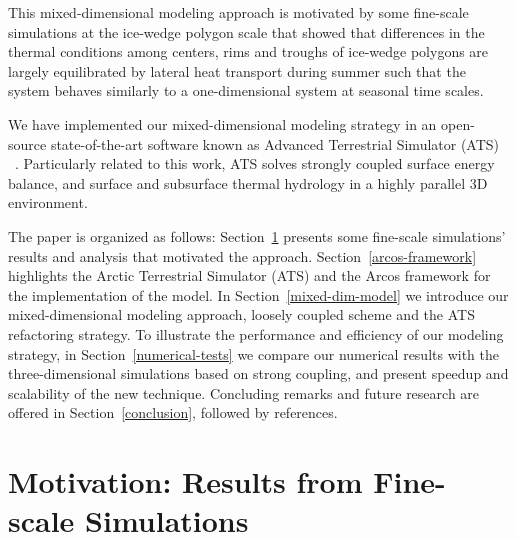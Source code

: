 \documentclass[review]{elsarticle}
\begin{document}
This mixed-dimensional modeling approach is motivated by some fine-scale simulations at the ice-wedge polygon scale that showed that differences in the thermal conditions among centers, rims and troughs of ice-wedge polygons are largely equilibrated by lateral heat transport during summer such that the system behaves similarly to a one-dimensional system at seasonal time scales. 

We have implemented our mixed-dimensional modeling strategy in an open-source state-of-the-art software known as Advanced Terrestrial Simulator (ATS) 
~\cite{ecoon2016managing, spainter2016integrated}. Particularly related to this work, ATS solves strongly coupled surface energy balance, and surface and subsurface thermal hydrology in a highly parallel 3D environment. 

The paper is organized as follows: Section~\ref{motivation} presents some fine-scale simulations' results and analysis that motivated the approach. Section~\ref{arcos-framework} highlights the Arctic Terrestrial Simulator (ATS) and the Arcos framework for the implementation of the model. In Section~\ref{mixed-dim-model} we introduce our mixed-dimensional modeling approach, loosely coupled scheme and the ATS refactoring strategy. To illustrate the performance and efficiency of our modeling strategy, in Section~\ref{numerical-tests} we compare our numerical results with the three-dimensional simulations based on strong coupling, and present speedup and scalability of the new technique. Concluding remarks and future research are offered in Section~\ref{conclusion}, followed by references.


\section{Motivation: Results from Fine-scale Simulations}\label{motivation}
\end{document}
